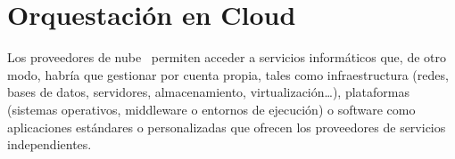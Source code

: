 %
%
%
%

\section{Orquestación en Cloud} \label{sec:orqc}
    Los proveedores de nube~\cite{cloud1} permiten acceder a servicios informáticos que, de otro modo, habría que gestionar por cuenta propia, tales como infraestructura (redes, bases de datos, servidores, almacenamiento, virtualización…), plataformas (sistemas operativos, middleware o entornos de ejecución) o software como aplicaciones estándares o personalizadas que ofrecen los proveedores de servicios independientes.

